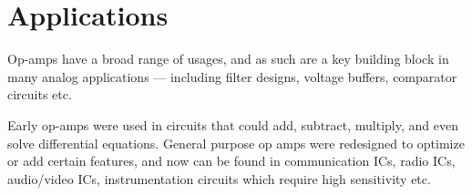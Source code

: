 \section{Applications}
Op-amps have a broad range of usages, and as such are a key building block in many analog applications — including filter designs, voltage buffers, comparator circuits etc. 

Early op-amps were used in circuits that could add, subtract, multiply, and even solve differential equations.  General purpose op amps were redesigned to optimize or add certain features, and now can be found in communication ICs, radio ICs, audio/video ICs, instrumentation circuits which require high sensitivity etc.